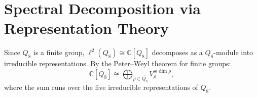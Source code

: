 \section{Spectral Decomposition via Representation Theory}
  \label{sec:spectral-decomposition}

  Since $Q_8$ is a finite group, $\ell^2(Q_8) \cong \mathbb{C}[Q_8]$ decomposes
  as a $Q_8$-module into irreducible representations.
  By the Peter--Weyl theorem for finite groups:
  \begin{equation}
    \mathbb{C}[Q_8] \cong \bigoplus_{\rho \in \widehat{Q_8}} V_\rho^{\oplus \dim \rho},
  \end{equation}
  where the sum runs over the five irreducible representations of $Q_8$.

  
  
  
